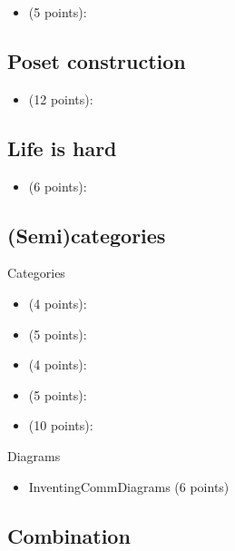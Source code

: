 \begin{itemize}
    \item {} (5 points): 
\end{itemize}

\subsection{Poset construction}
\begin{itemize}
    \item {} (12 points): 
\end{itemize}

\subsection{Life is hard}
\begin{itemize}
    \item {} (6 points): 
\end{itemize}

\subsection{(Semi)categories}

Categories
\begin{itemize}
    \item {} (4 points): 
    \item {} (5 points): 
    \item {} (4 points): 
    \item {} (5 points): 
    \item {} (10 points): 
\end{itemize}

Diagrams
\begin{itemize}
    \item InventingCommDiagrams (6 points) 
\end{itemize}

\subsection{Combination}

